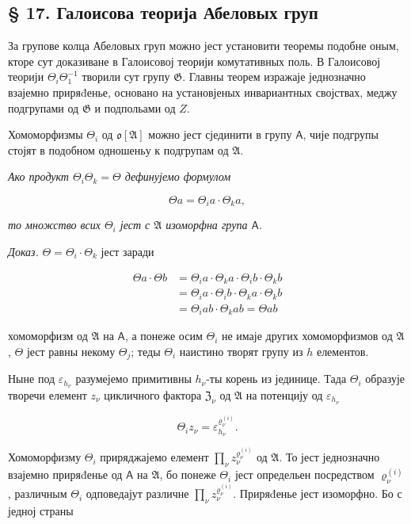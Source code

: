 \documentclass[11pt]{article}
\begin{document}
\subsection*{§ 17. Галоисова теорија Абеловых груп}\label{die-galoissche-theorie-abelscher-gruppen}

За групове колца Абеловых груп можно јест установити теоремы подобне оным, кторе сут доказиване в Галоисовој теорији комутативных поль. В Галоисовој теорији \(\Theta_i\Theta_1^{-1}\) творили сут групу \(\mathfrak{G}\). Главны теорем изражаје једнозначно взајемно приряđенье, основано на установјеных инвариантных својствах, меджу подгрупами од \(\mathfrak{G}\) и подпольами од \(Z\).

Хомоморфизмы \(\Theta_i\) од \(\mathfrak{o}[\mathfrak{A}]\) можно јест сјединити в групу \(\mathsf A\), чије подгрупы стојят в подобном одношеньу к подгрупам од \(\mathfrak{A}\).

\emph{Ако продукт \(\Theta_i \Theta_k = \Theta\) дефинујемо формулом}

\[\Theta a = \Theta_i a \cdot \Theta_k a,\]

\emph{то множство всих \(\Theta_i\) јест с \(\mathfrak A\) изоморфна група \(\mathsf A\).}

\emph{Доказ.} \(\Theta = \Theta_i \cdot \Theta_k\) јест заради

\[\begin{aligned}
\Theta a \cdot \Theta b &= \Theta_i a \cdot \Theta_k a \cdot \Theta_i b \cdot \Theta_k b \\
&= \Theta_i a \cdot \Theta_i b \cdot \Theta_k a \cdot \Theta_k b \\
&= \Theta_i a b \cdot \Theta_k a b = \Theta a b
\end{aligned}\]

хомоморфизм од \(\mathfrak A\) на \(\mathsf A\), а понеже осим \(\Theta_i\) не имаје других хомоморфизмов од \(\mathfrak A\), \(\Theta\) јест равны некому \(\Theta_j\); теды \(\Theta_i\) наистино творят групу из \(h\) елементов.

Ныне под \(\varepsilon_{h_\nu}\) разумејемо примитивны \(h_\nu\)-ты корень из јединице. Тада \(\Theta_i\) образује творечи елемент \(z_\nu\) цикличного фактора \(\mathfrak Z_\nu\) од \(\mathfrak A\) на потенцију од \(\varepsilon_{h_\nu}\)

\[
\Theta_i z_\nu=\varepsilon_{h_\nu}^{\varrho_\nu^{(i)}}.
\]

Хомоморфизму \(\Theta_i\) приряджајемо елемент \(\prod_\nu z_\nu^{\varrho_\nu^{(i)}}\) од \(\mathfrak A\). То јест једнозначно взајемно приряđенье од \(\mathsf A\) на \(\mathfrak A\), бо понеже \(\Theta_i\) јест определьен посредством \(\varrho_\nu^{(i)}\), различным \(\Theta_i\) одповедајут различне \(\prod_\nu z_\nu^{\varrho_\nu^{(i)}}\). Приряđенье јест изоморфно. Бо с једној страны
\end{document}
